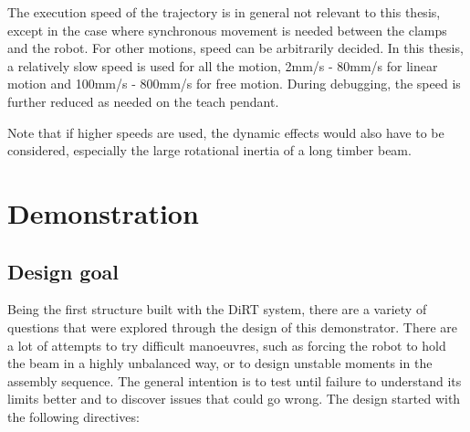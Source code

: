 The execution speed of the trajectory is in general not relevant to this thesis, except in the case where synchronous movement is needed between the clamps and the robot. For other motions, speed can be arbitrarily decided. In this thesis, a relatively slow speed is used for all the motion, 2mm/s - 80mm/s for linear motion and 100mm/s - 800mm/s for free motion. During debugging, the speed is further reduced as needed on the teach pendant. 

Note that if higher speeds are used, the dynamic effects would also have to be considered, especially the large rotational inertia of a long timber beam.

\section{Demonstration}
\label{section:exploration-2-demonstration}

\subsection{Design goal}
\label{subsection:exploration-2-design-goal}

Being the first structure built with the DiRT system, there are a variety of questions that were explored through the design of this demonstrator. There are a lot of attempts to try difficult manoeuvres, such as forcing the robot to hold the beam in a highly unbalanced way, or to design unstable moments in the assembly sequence. The general intention is to test until failure to understand its limits better and to discover issues that could go wrong. The design started with the following directives:

